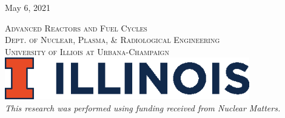 \begin{titlepage}

    \vspace{0.5cm} %
    {\large May 6, 2021} %
    \vspace{0.5cm}


    \textsc{\LARGE Advanced Reactors and Fuel Cycles}\\[0.25cm] %

    \textsc{\large Dept. of Nuclear, Plasma, \& Radiological Engineering}\\%

    \textsc{\large University of Illiois at Urbana-Champaign}\\ %




    \vspace{0.5cm}
    \includegraphics[width=0.8\textwidth]{./img/illinois.eps}\\[1cm] %


    \textit{This research was performed using funding received from Nuclear
    Matters.}

\end{titlepage}


\pagebreak





\FloatBarrier






